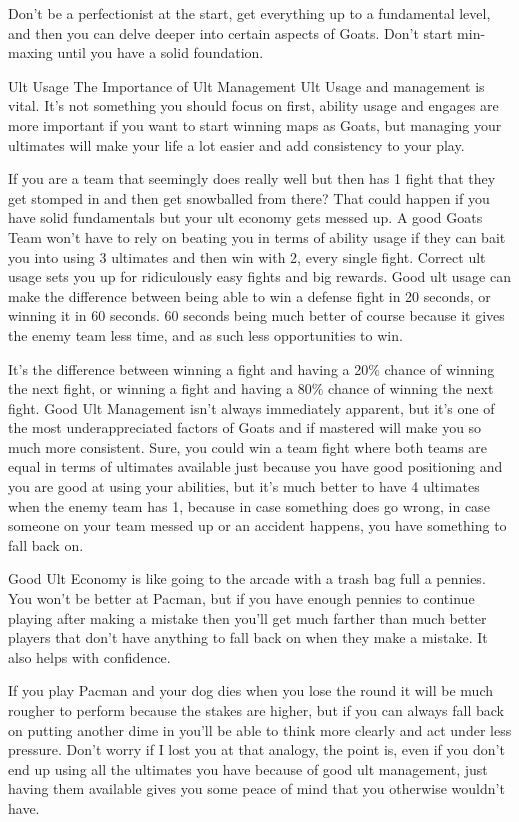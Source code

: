 Don’t be a perfectionist at the start, get everything up to a fundamental level, and then you can delve deeper into certain aspects of Goats. Don’t start min-maxing until you have a solid foundation.	





Ult Usage
The Importance of Ult Management 
Ult Usage and management is vital. It’s not something you should focus on first, ability usage and engages are more important if you want to start winning maps as Goats, but managing your ultimates will make your life a lot easier and add consistency to your play.

If you are a team that seemingly does really well but then has 1 fight that they get stomped in and then get snowballed from there? That could happen if you have solid fundamentals but your ult economy gets messed up. A good Goats Team won’t have to rely on beating you in terms of ability usage if they can bait you into using 3 ultimates and then win with 2, every single fight. Correct ult usage sets you up for ridiculously easy fights and big rewards. Good ult usage can make the difference between being able to win a defense fight in 20 seconds, or winning it in 60 seconds. 60 seconds being much better of course because it gives the enemy team less time, and as such less opportunities to win.

It’s the difference between winning a fight and having a 20\% chance of winning the next fight, or winning a fight and having a 80\% chance of winning the next fight. Good Ult Management isn’t always immediately apparent, but it’s one of the most underappreciated factors of Goats and if mastered will make you so much more consistent. Sure, you could win a team fight where both teams are equal in terms of ultimates available just because you have good positioning and you are good at using your abilities, but it’s much better to have 4 ultimates when the enemy team has 1, because in case something does go wrong, in case someone on your team messed up or an accident happens, you have something to fall back on.



Good Ult Economy is like going to the arcade with a trash bag full a pennies. You won’t be better at Pacman, but if you have enough pennies to continue playing after making a mistake then you’ll get much farther than much better players that don’t have anything to fall back on when they make a mistake. It also helps with confidence.

If you play Pacman and your dog dies when you lose the round it will be much rougher to perform because the stakes are higher, but if you can always fall back on putting another dime in you’ll be able to think more clearly and act under less pressure. Don’t worry if I lost you at that analogy, the point is, even if you don’t end up using all the ultimates you have because of good ult management, just having them available gives you some peace of mind that you otherwise wouldn’t have.

